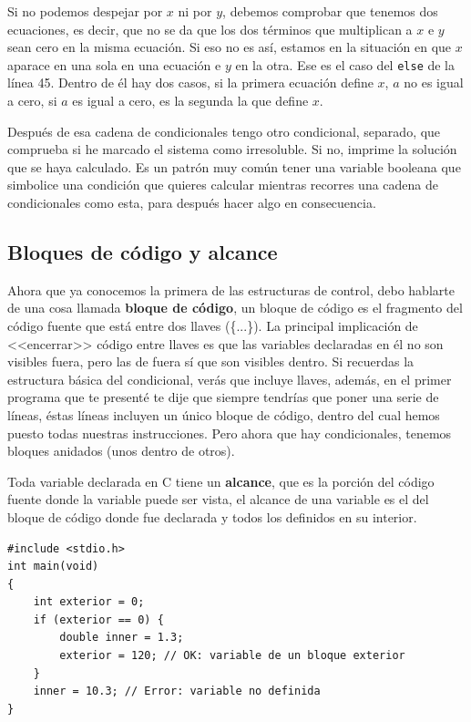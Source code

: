 \documentclass[a4paper]{article}
\begin{document}
Si no podemos despejar por $x$ ni por $y$, debemos comprobar que tenemos dos
ecuaciones, es decir, que no se da que los dos términos que multiplican a $x$ e
$y$ sean cero en la misma ecuación.
Si eso no es así, estamos en la situación en que $x$ aparace en una
sola en una ecuación e $y$ en la otra. Ese es el caso del \verb!else! de la
línea 45.
Dentro de él hay dos casos, si la primera ecuación define $x$, $a$
no es igual a cero, si $a$ es igual a cero, es la segunda la que define $x$.

Después de esa cadena de condicionales tengo otro condicional, separado, que
comprueba si he marcado el sistema como irresoluble. Si no, imprime la solución
que se haya calculado. Es un patrón muy común tener una variable booleana
que simbolice una condición que quieres calcular mientras recorres una cadena
de condicionales como esta, para después hacer algo en consecuencia.
\subsection{Bloques de código y alcance}
Ahora que ya conocemos la primera de las estructuras de control, debo hablarte
de una cosa llamada \textbf{bloque de código}, un bloque de código es el
fragmento del código fuente que está entre dos llaves (\{...\}). La principal
implicación de <<encerrar>> código entre llaves es que las variables declaradas
en él no son visibles fuera, pero las de fuera sí que son visibles dentro.
Si recuerdas
la estructura básica del condicional, verás que incluye llaves, además, en el
primer programa que te presenté te dije que siempre tendrías que poner una serie
de líneas, éstas líneas incluyen un único bloque de código, dentro del cual
hemos puesto todas nuestras instrucciones. Pero ahora que hay condicionales,
tenemos bloques anidados (unos dentro de otros).

Toda variable declarada en C tiene un
\textbf{alcance}, que es la porción del
código fuente donde la variable puede ser vista, el alcance de una variable es
el del bloque de código donde fue declarada y todos los definidos en su
interior.


\noindent
\begin{minipage}[H]{\linewidth}
\mbox{}
\begin{lstlisting}[style=C,
caption={Ejemplo de alcance de variables declaradas},
label={lst:scopeVar}]
#include <stdio.h>
int main(void)
{
    int exterior = 0;
    if (exterior == 0) {
        double inner = 1.3;
        exterior = 120; // OK: variable de un bloque exterior
    }
    inner = 10.3; // Error: variable no definida
}
\end{lstlisting}
\end{minipage}
\end{document}
